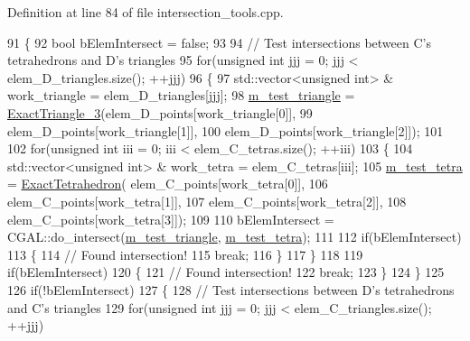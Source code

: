 Definition at line 84 of file intersection\+\_\+tools.\+cpp.


\begin{DoxyCode}
91 \{
92     \textcolor{keywordtype}{bool} bElemIntersect = \textcolor{keyword}{false};
93 
94     \textcolor{comment}{// Test intersections between C's tetrahedrons and D's triangles}
95     \textcolor{keywordflow}{for}(\textcolor{keywordtype}{unsigned} \textcolor{keywordtype}{int} jjj = 0; jjj < elem\_D\_triangles.size(); ++jjj)
96     \{
97         std::vector<unsigned int> & work\_triangle = elem\_D\_triangles[jjj];
98         \hyperlink{classcarl_1_1_intersection___tools_a4331121a50baaa93e499f6cfb446c1b0}{m\_test\_triangle} = \hyperlink{_c_g_a_l__typedefs_8h_acb9586e4ea704b6a4c4502ad0cb03c62}{ExactTriangle\_3}(elem\_D\_points[work\_triangle[0]],
99                 elem\_D\_points[work\_triangle[1]],
100                 elem\_D\_points[work\_triangle[2]]);
101 
102         \textcolor{keywordflow}{for}(\textcolor{keywordtype}{unsigned} \textcolor{keywordtype}{int} iii = 0; iii < elem\_C\_tetras.size(); ++iii)
103         \{
104             std::vector<unsigned int> & work\_tetra = elem\_C\_tetras[iii];
105             \hyperlink{classcarl_1_1_intersection___tools_a69657597ebb9655f8797b289939835a3}{m\_test\_tetra} = \hyperlink{_c_g_a_l__typedefs_8h_a02a72c8dcf4a17c7460e7e71301d2d3f}{ExactTetrahedron}(    elem\_C\_points[work\_tetra[0]],
106                     elem\_C\_points[work\_tetra[1]],
107                     elem\_C\_points[work\_tetra[2]],
108                     elem\_C\_points[work\_tetra[3]]);
109 
110             bElemIntersect = CGAL::do\_intersect(\hyperlink{classcarl_1_1_intersection___tools_a4331121a50baaa93e499f6cfb446c1b0}{m\_test\_triangle},
      \hyperlink{classcarl_1_1_intersection___tools_a69657597ebb9655f8797b289939835a3}{m\_test\_tetra});
111 
112             \textcolor{keywordflow}{if}(bElemIntersect)
113             \{
114                 \textcolor{comment}{// Found intersection!}
115                 \textcolor{keywordflow}{break};
116             \}
117         \}
118 
119         \textcolor{keywordflow}{if}(bElemIntersect)
120         \{
121             \textcolor{comment}{// Found intersection!}
122             \textcolor{keywordflow}{break};
123         \}
124     \}
125 
126     \textcolor{keywordflow}{if}(!bElemIntersect)
127     \{
128         \textcolor{comment}{// Test intersections between D's tetrahedrons and C's triangles}
129         \textcolor{keywordflow}{for}(\textcolor{keywordtype}{unsigned} \textcolor{keywordtype}{int} jjj = 0; jjj < elem\_C\_triangles.size(); ++jjj)

\end{DoxyCode}
